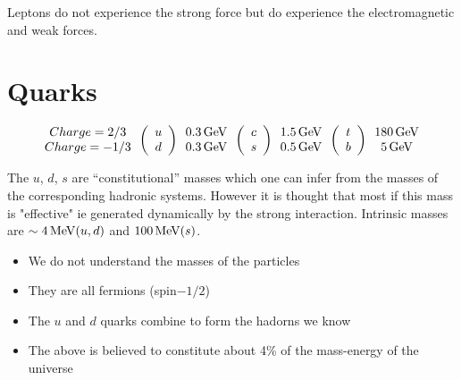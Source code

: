Leptons do not experience the strong force but do experience the electromagnetic and weak forces.

\section{Quarks}

\[
  \begin{array}{ccccccc}
    \begin{array}{c}
    Charge =  2/3 \\
    Charge = -1/3
    \end{array}
    
  \left(
    \begin{array}{c}
    u \\
    d
    \end{array}
  \right)
  
    \begin{array}{c}
    0.3 \mathrm{\,GeV} \\
    0.3 \mathrm{\,GeV}
    \end{array}
  
  \left(
    \begin{array}{c}
    c \\
    s 
    \end{array}
  \right)
  
    \begin{array}{c}
    1.5 \mathrm{\,GeV} \\
    0.5 \mathrm{\,GeV}
    \end{array}
  
  \left(
    \begin{array}{c}
    t \\
    b
    \end{array}
  \right)
  
    \begin{array}{c}
    180 \mathrm{\,GeV} \\
    5 \mathrm{\,GeV}
    \end{array}
  \end{array}
\]

The $u$, $d$, $s$ are ``constitutional'' masses which one can infer from the masses of the corresponding hadronic systems.  However it is thought that most if this mass is "effective" ie generated dynamically by the strong interaction.  Intrinsic masses are $\sim 4\mathrm{\,MeV} (u,d)$ and $100\mathrm{\,MeV}(s)$.

\begin{itemize}
  \item We do not understand the masses of the particles
  \item They are all fermions (spin$-1/2$)
  \item The $u$ and $d$ quarks combine to form the hadorns we know
  \item The above is believed to constitute about 4\% of the mass-energy of the universe
\end{itemize}

